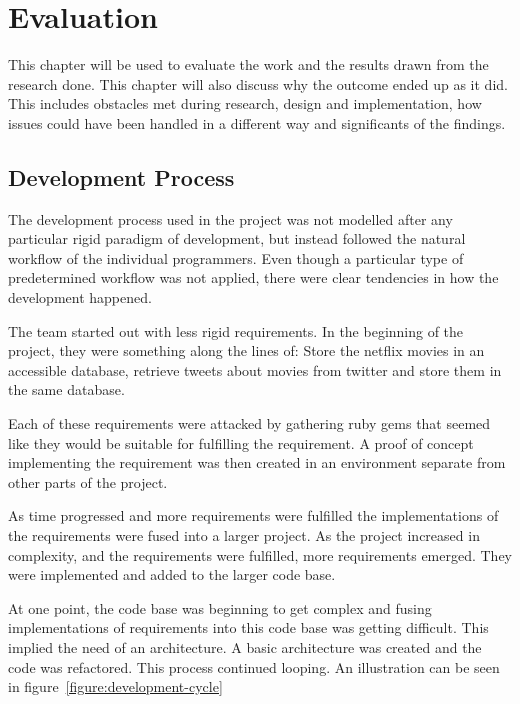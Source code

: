 
\chapter{Evaluation}

\minitoc

This chapter will be used to evaluate the work and the results drawn from the research done. This chapter will also discuss why the outcome ended up as it did. This includes obstacles met during research, design and implementation, how issues could have been handled in a different way and significants of the findings.

\clearpage


\section{Development Process}
The development process used in the project was not modelled after any particular rigid paradigm of development, but instead followed the natural workflow of the individual programmers. Even though a particular type of predetermined workflow was not applied, there were clear tendencies in how the development happened.

The team started out with less rigid requirements. In the beginning of the project, they were something along the lines of: Store the netflix movies in an accessible database, retrieve tweets about movies from twitter and store them in the same database.

Each of these requirements were attacked by gathering ruby gems that seemed like they would be suitable for fulfilling the requirement. A proof of concept implementing the requirement was then created in an environment separate from other parts of the project.

As time progressed and more requirements were fulfilled the implementations of the requirements were fused into a larger project. As the project increased in complexity, and the requirements were fulfilled, more requirements emerged. They were implemented and added to the larger code base.

At one point, the code base was beginning to get complex and fusing implementations of requirements into this code base was getting difficult. This implied the need of an architecture. A basic architecture was created and the code was refactored. This process continued looping. An illustration can be seen in figure~\ref{figure:development-cycle}

